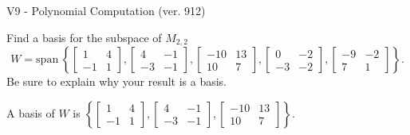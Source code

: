 \begin{exercise}
  \begin{exerciseTitle}V9 - Polynomial Computation (ver. 912)\end{exerciseTitle}
  \begin{exerciseStatement}
    Find a basis for the subspace of \(M_{2,2}\) 
\[W=\mathrm{span}\ \left\{\left[\begin{array}{cc}
1 & 4 \\
-1 & 1
\end{array}\right] , \left[\begin{array}{cc}
4 & -1 \\
-3 & -1
\end{array}\right] , \left[\begin{array}{cc}
-10 & 13 \\
10 & 7
\end{array}\right] , \left[\begin{array}{cc}
0 & -2 \\
-3 & -2
\end{array}\right] , \left[\begin{array}{cc}
-9 & -2 \\
7 & 1
\end{array}\right]\right\}.\]
 Be sure to explain why your result is a basis.


  \end{exerciseStatement}
  \begin{exerciseAnswer}
   A basis of \(W\) is  \(\left\{\left[\begin{array}{cc}
1 & 4 \\
-1 & 1
\end{array}\right] , \left[\begin{array}{cc}
4 & -1 \\
-3 & -1
\end{array}\right] , \left[\begin{array}{cc}
-10 & 13 \\
10 & 7
\end{array}\right]\right\}\).
  


  \end{exerciseAnswer}
\end{exercise}